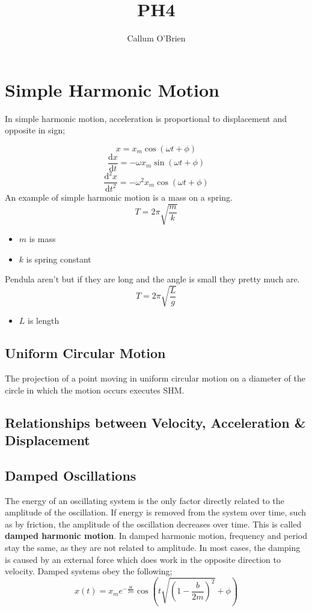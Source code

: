 \documentclass{article}
\title{PH4}
\author{Callum O'Brien}
\begin{document}
\maketitle
\tableofcontents
\newpage

\section{Simple Harmonic Motion}

\noindent In simple harmonic motion, acceleration is proportional to displacement and opposite in sign;

\[x=x_m\cos(\omega t+\phi)\]
\[\frac{\textrm{d}x}{\textrm{d}t}=-\omega x_m\sin(\omega t+\phi)\]
\[\frac{\textrm{d}^2x}{\textrm{d}t^2}=-\omega^2x_m\cos(\omega t+\phi)\]
An example of simple harmonic motion is a mass on a spring. 
\[T=2\pi\sqrt{\frac{m}{k}}\]
\begin{itemize}
	\item $m$ is mass
	\item $k$ is spring constant
\end{itemize}
Pendula aren't but if they are long and the angle is small they pretty much are.
\[T=2\pi\sqrt{\frac{L}{g}}\]
\begin{itemize}
	\item $L$ is length
\end{itemize}

\subsection{Uniform Circular Motion}
The projection of a point moving in uniform circular motion on a diameter of the circle in which the motion occurs executes SHM.

\subsection{Relationships between Velocity, Acceleration \& Displacement}

\subsection{Damped Oscillations}
The energy of an oscillating system is the only factor directly related to the amplitude of the oscillation. If energy is removed from the system over time, such as by friction, the amplitude of the oscillation decreases over time. This is called \textbf{damped harmonic motion}. In damped harmonic motion, frequency and period stay the same, as they are not related to amplitude. In most cases, the damping is caused by an external force which does work in the opposite direction to velocity. Damped systems obey the following;
\[x(t)=x_me^{-\frac{bt}{2m}}\cos\left(t\sqrt{\left(1-\frac{b}{2m}\right)^2}+\phi\right)\]
\end{document}
